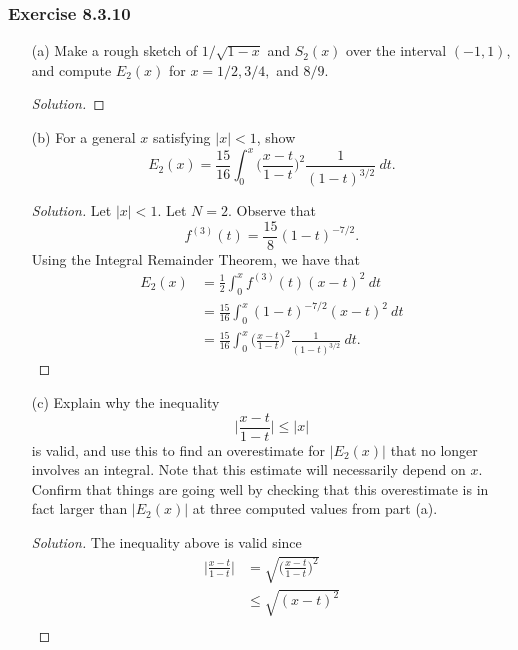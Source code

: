\subsubsection{Exercise 8.3.10} 
\begin{enumerate}
    \item[(a)] Make a rough sketch of \( 1 / \sqrt{ 1 -x  }  \) and \( S_{2}(x)  \) over the interval \( (-1,1)  \), and compute \( E_{2}(x)  \) for \( x = 1/2 , 3/4 ,  \) and \( 8/9  \).
        \begin{proof}[Solution]
        
        \end{proof}
    \item[(b)] For a general \( x  \) satisfying \(  |  x  |  < 1  \), show 
        \[  E_{2}(x) = \frac{ 15 }{ 16  }  \int_{ 0 }^{ x  }  \Big( \frac{ x - t  }{ 1 - t  }  \Big)^{2} \frac{ 1 }{ (1-t)^{3/2 } }  \ dt. \]
        \begin{proof}[Solution]
        Let \( |  x  |  < 1  \). Let \( N = 2  \). Observe that 
        \[  f^{(3)}(t) = \frac{ 15 }{ 8  }  (1- t )^{-7/2}.\] Using the Integral Remainder Theorem, we have that 
        \begin{align*}
            E_{2}(x) &= \frac{ 1 }{ 2 } \int_{ 0 }^{ x }  f^{(3)}(t) (x-t)^{2} \  dt   \\
                     &= \frac{ 15 }{ 16 } \int_{ 0 }^{ x }  (1-t)^{-7/2} (x - t )^{2} \  dt \\
                     &= \frac{ 15 }{ 16 }  \int_{ 0 }^{ x  }  \Big( \frac{ x - t  }{ 1 - t  }  \Big)^{2} \frac{ 1 }{ (1-t)^{3/2 } }  \  dt.
        \end{align*}
        \end{proof}
    \item[(c)] Explain why the inequality 
        \[  \Big| \frac{ x - t  }{ 1 -t  }  \Big|  \leq | x  |  \]
        is valid, and use this to find an overestimate for \( | E_{2}(x)  |   \) that no longer involves an integral. Note that this estimate will necessarily depend on \( x  \). Confirm that things are going well by checking that this overestimate is in fact larger than \( | E_{2}(x)  |  \) at three computed values from part (a).
        \begin{proof}[Solution]
        The inequality above is valid since 
        \begin{align*}
            \Big| \frac{ x - t  }{  1 - t  }  \Big|  &= \sqrt{  \Big( \frac{ x - t  }{ 1 - t  }  \Big)^{2}  }  \\
                                                     &\leq \sqrt{ (x - t )^{2} }  \\

\end{align*}
\end{proof}
\end{enumerate}
